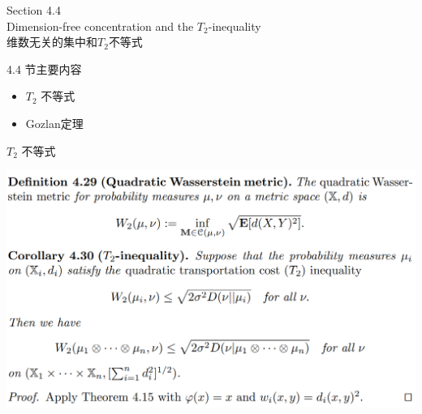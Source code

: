 \documentclass{beamer}
\begin{document}
\begin{frame}
\begin{center}
\Large Section 4.4 \\ Dimension-free concentration and the \texorpdfstring{$T_2$}{2}-inequality \\ 维数无关的集中和\texorpdfstring{$T_2$}{2}不等式
\end{center}
\end{frame}

\begin{frame}{4.4 节主要内容}
\begin{itemize}
    \item $T_2$ 不等式
    \item Gozlan定理
\end{itemize}
\end{frame}

\begin{frame}{$T_2$ 不等式}

\begin{center}
    \includegraphics[width=1.0\textwidth, frame]{figures/4-29-def-4-30-corol.png}
\end{center}

\end{frame}
\end{document}
